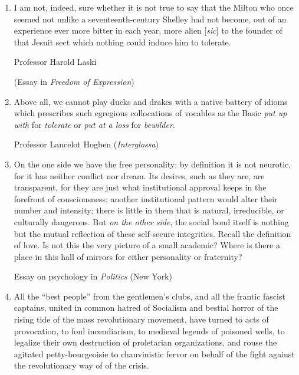 \documentclass[a4paper]{article}
\begin{document}
\small
\begin{enumerate}
    \item I am not, indeed, sure whether it is not true to say that the Milton who once seemed not unlike a seventeenth-century Shelley had not become, out of an experience ever more bitter in each year, more alien [\textit{sic}] to the founder of that Jesuit sect which nothing could induce him to tolerate.
    
    \hfill\begin{minipage}{0.3\linewidth}
    Professor Harold Laski 
    \end{minipage}
    
    \hfill\begin{minipage}{0.35\linewidth}
    (Essay in \textit{Freedom of Expression})
    \end{minipage}
    
    \item Above all, we cannot play ducks and drakes with a native battery of idioms which prescribes such egregious collocations of vocables as the Basic \textit{put up with} for \textit{tolerate} or \textit{put at a loss} for \textit{bewilder}.
    
    \hfill \begin{minipage}{0.45\linewidth}
            Professor Lancelot Hogben (\textit{Interglossa})
           \end{minipage}
    
    \item On the one side we have the free personality: by definition it is not neurotic, for it has neither conflict nor dream. Its desires, such as they are, are transparent, for they are just what institutional approval keeps in the forefront of consciousness; another institutional pattern would alter their number and intensity; there is little in them that is natural, irreducible, or culturally dangerous. But \textit{on the other side}, the social bond itself is nothing but the mutual reflection of these self-secure integrities. Recall the definition of love. Is not this the very picture of a small academic? Where is there a place in this hall of mirrors for either personality or fraternity? 
    
    \hfill \begin{minipage}{0.48\linewidth}
            Essay on psychology in \textit{Politics} (New York)
           \end{minipage}
           
    \item All the ``best people'' from the gentlemen's clubs, and all the frantic fascist captains, united in common hatred of Socialism and bestial horror of the rising tide of the mass revolutionary movement, have turned to acts of provocation, to foul incendiarism, to medieval legends of poisoned wells, to legalize their own destruction of proletarian organizations, and rouse the agitated petty-bourgeoisie to chauvinistic fervor on behalf of the fight against the revolutionary way of of the crisis.
    

\end{enumerate}
\end{document}
